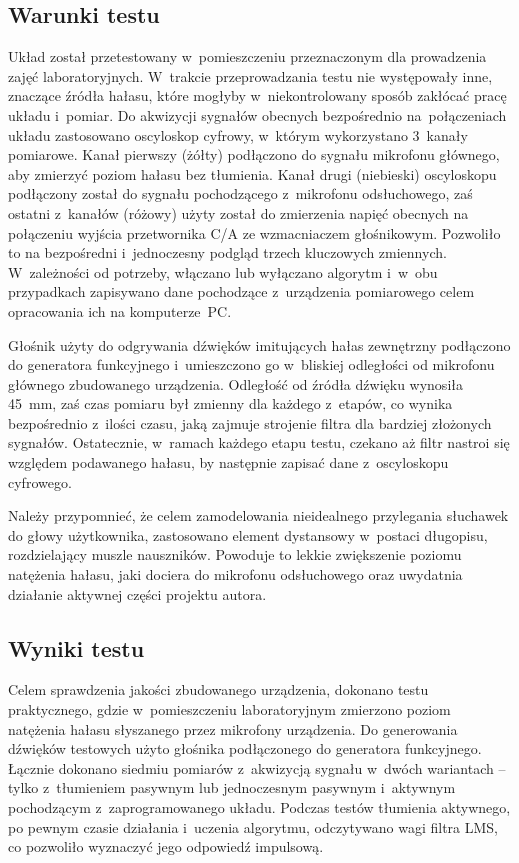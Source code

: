 \subsection{Warunki testu}
\label{subsec:circumstances}
Układ został przetestowany w~pomieszczeniu przeznaczonym dla prowadzenia zajęć laboratoryjnych. W~trakcie przeprowadzania testu nie występowały inne, znaczące źródła hałasu, które mogłyby w~niekontrolowany sposób zakłócać pracę układu i~pomiar. Do akwizycji sygnałów obecnych bezpośrednio na~połączeniach układu zastosowano oscyloskop cyfrowy, w~którym wykorzystano 3~kanały pomiarowe. Kanał pierwszy (żółty) podłączono do sygnału mikrofonu głównego, aby zmierzyć poziom hałasu bez tłumienia. Kanał drugi (niebieski) oscyloskopu podłączony został do sygnału pochodzącego z~mikrofonu odsłuchowego, zaś ostatni z~kanałów (różowy) użyty został do zmierzenia napięć obecnych na połączeniu wyjścia przetwornika C/A ze wzmacniaczem głośnikowym. Pozwoliło to na bezpośredni i~jednoczesny podgląd trzech kluczowych zmiennych. W~zależności od potrzeby, włączano lub wyłączano algorytm i~w~obu przypadkach zapisywano dane pochodzące z~urządzenia pomiarowego celem opracowania ich na komputerze~PC.

Głośnik użyty do odgrywania dźwięków imitujących hałas zewnętrzny podłączono do generatora funkcyjnego i~umieszczono go w~bliskiej odległości od mikrofonu głównego zbudowanego urządzenia. Odległość od źródła dźwięku wynosiła \SI{45}{\mm}, zaś czas pomiaru był zmienny dla każdego z~etapów, co wynika bezpośrednio z~ilości czasu, jaką zajmuje strojenie filtra dla bardziej złożonych sygnałów. Ostatecznie, w~ramach każdego etapu testu, czekano aż filtr nastroi się względem podawanego hałasu, by następnie zapisać dane z~oscyloskopu cyfrowego.

Należy przypomnieć, że celem zamodelowania nieidealnego przylegania słuchawek do głowy użytkownika, zastosowano element dystansowy w~postaci długopisu, rozdzielający muszle nauszników. Powoduje to lekkie zwiększenie poziomu natężenia hałasu, jaki dociera do mikrofonu odsłuchowego oraz uwydatnia działanie aktywnej części projektu autora. 
\subsection{Wyniki testu}
Celem sprawdzenia jakości zbudowanego urządzenia, dokonano testu praktycznego, gdzie w~pomieszczeniu laboratoryjnym zmierzono poziom natężenia hałasu słyszanego przez mikrofony urządzenia. Do generowania dźwięków testowych użyto głośnika podłączonego do generatora funkcyjnego. Łącznie dokonano siedmiu pomiarów z~akwizycją sygnału w~dwóch wariantach -- tylko z~tłumieniem pasywnym lub jednoczesnym pasywnym i~aktywnym pochodzącym z~zaprogramowanego układu. Podczas testów tłumienia aktywnego, po pewnym czasie działania i~uczenia algorytmu, odczytywano wagi filtra LMS, co pozwoliło wyznaczyć jego odpowiedź impulsową.

